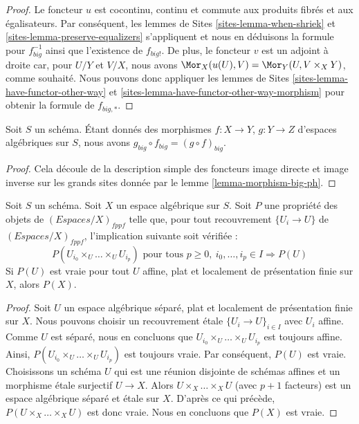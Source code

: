 \begin{proof}
Le foncteur $u$ est cocontinu, continu et commute aux produits fibrés
et aux égalisateurs. Par conséquent,
les lemmes de Sites \ref{sites-lemma-when-shriek} et
\ref{sites-lemma-preserve-equalizers}
s'appliquent et nous en déduisons la formule
pour $f_{big}^{-1}$ ainsi que l'existence de $f_{big!}$. De plus,
le foncteur $v$ est un adjoint à droite car, pour $U/Y$ et $V/X$,
nous avons $\Mor_X(u(U), V) = \Mor_Y(U, V \times_X Y)$,
comme souhaité. Nous pouvons donc appliquer
les lemmes de Sites \ref{sites-lemma-have-functor-other-way} et
\ref{sites-lemma-have-functor-other-way-morphism} pour obtenir la
formule de $f_{big, *}$.
\end{proof}

\begin{lemma}
\label{lemma-composition-ph}
Soit $S$ un schéma. Étant donnés des morphismes $f : X \to Y$, $g : Y \to Z$
d'espaces algébriques sur $S$, nous avons
$g_{big} \circ f_{big} = (g \circ f)_{big}$.
\end{lemma}

\begin{proof}
Cela découle de la description simple des foncteurs image directe
et image inverse sur les grands sites donnée par le
lemme \ref{lemma-morphism-big-ph}.
\end{proof}

\begin{lemma}
\label{lemma-cech-enough}
Soit $S$ un schéma. Soit $X$ un espace algébrique sur $S$.
Soit $P$ une propriété des objets de $(\textit{Espaces}/X)_{fppf}$
telle que, pour tout recouvrement $\{U_i \to U\}$ de
$(\textit{Espaces}/X)_{fppf}$, l'implication suivante soit vérifiée :
$$
P(U_{i_0} \times_U \ldots \times_U U_{i_p})
\text{ pour tous }
p \geq 0,\ i_0, \ldots, i_p \in I
\Rightarrow P(U)
$$
Si $P(U)$ est vraie pour tout $U$ affine, plat et localement de présentation finie sur $X$,
alors $P(X)$.
\end{lemma}

\begin{proof}
Soit $U$ un espace algébrique séparé, plat et localement de présentation finie sur $X$.
Nous pouvons choisir un recouvrement \'etale $\{U_i \to U\}_{i \in I}$ avec $U_i$
affine. Comme $U$ est séparé, nous en concluons que
$U_{i_0} \times_U \ldots \times_U U_{i_p}$ est toujours affine.
Ainsi, $P(U_{i_0} \times_U \ldots \times_U U_{i_p})$ est toujours vraie.
Par conséquent, $P(U)$ est vraie. Choisissons un schéma $U$ qui est une réunion disjointe de
schémas affines et un morphisme \'etale surjectif $U \to X$.
Alors $U \times_X \ldots \times_X U$ (avec $p + 1$ facteurs)
est un espace algébrique séparé
et \'etale sur $X$. D'après ce qui précède, $P(U \times_X \ldots \times_X U)$ est donc vraie.
Nous en concluons que $P(X)$ est vraie.
\end{proof}












